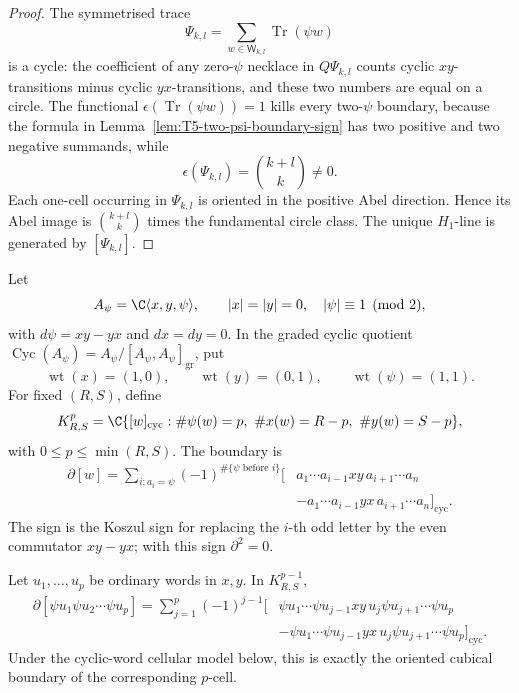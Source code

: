 \begin{proof}
  The symmetrised trace
  \[
    \Psi_{k,l}=\sum_{w\in\mathsf W_{k,l}}\operatorname{Tr}(\psi w)
  \]
  is a cycle: the coefficient of any zero-\(\psi\) necklace in
  \(Q\Psi_{k,l}\) counts cyclic \(xy\)-transitions minus cyclic
  \(yx\)-transitions, and these two numbers are equal on a circle.  The
  functional \(\epsilon(\operatorname{Tr}(\psi w))=1\) kills every
  two-\(\psi\) boundary, because the formula in
  Lemma~\ref{lem:T5-two-psi-boundary-sign} has two positive and two
  negative summands, while
  \[
    \epsilon(\Psi_{k,l})=\binom{k+l}{k}\neq0.
  \]
  Each one-cell occurring in \(\Psi_{k,l}\) is oriented in the positive
  Abel direction.  Hence its Abel image is
  \(\binom{k+l}{k}\) times the fundamental circle class.  The unique
  \(H_1\)-line is generated by \([\Psi_{k,l}]\).
\end{proof}

\begin{defn}\label{def:T5-full-psi-complex}
  Let
	  \[
	    A_\psi=\C\langle x,y,\psi\rangle,\qquad
	    |x|=|y|=0,\quad |\psi|\equiv1\pmod2,
	  \]
  with \(d\psi=xy-yx\) and \(dx=dy=0\).  In the graded cyclic quotient
  \(\operatorname{Cyc}(A_\psi)=A_\psi/[A_\psi,A_\psi]_{\mathrm{gr}}\),
  put
  \[
    \operatorname{wt}(x)=(1,0),\qquad
    \operatorname{wt}(y)=(0,1),\qquad
    \operatorname{wt}(\psi)=(1,1).
  \]
  For fixed \((R,S)\), define
  \[
    K^p_{R,S}
      =
      \C\{[w]_{\mathrm{cyc}}:
        \#\psi(w)=p,\ \#x(w)=R-p,\ \#y(w)=S-p\},
  \]
  with \(0\le p\le\min(R,S)\).  The boundary is
  \[
  \begin{aligned}
    \partial[w]
      =
      \sum_{i:a_i=\psi}(-1)^{\#\{\psi\text{ before }i\}}
      [&a_1\cdots a_{i-1}xy\,a_{i+1}\cdots a_n  \\
       &-a_1\cdots a_{i-1}yx\,a_{i+1}\cdots a_n]_{\mathrm{cyc}} .
  \end{aligned}
  \]
  The sign is the Koszul sign for replacing the \(i\)-th odd letter by
  the even commutator \(xy-yx\); with this sign \(\partial^2=0\).
\end{defn}

\begin{lem}\label{lem:T5-full-p-face-sign}
  Let \(u_1,\ldots,u_p\) be ordinary words in \(x,y\).  In
  \(K^{p-1}_{R,S}\),
  \[
  \begin{aligned}
    \partial[\psi u_1\psi u_2\cdots\psi u_p]
      =
      \sum_{j=1}^p(-1)^{j-1}
      [&\psi u_1\cdots\psi u_{j-1}xy\,u_j
        \psi u_{j+1}\cdots\psi u_p\\
       &-\psi u_1\cdots\psi u_{j-1}yx\,u_j
        \psi u_{j+1}\cdots\psi u_p]_{\mathrm{cyc}} .
  \end{aligned}
  \]
  Under the cyclic-word cellular model below, this is exactly the
  oriented cubical boundary of the corresponding \(p\)-cell.
\end{lem}

